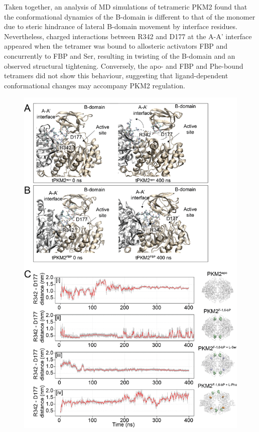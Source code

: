 %
%
Taken together, an analysis of MD simulations of tetrameric PKM2 found that the conformational dynamics of the B-domain is different to that of the monomer due to steric hindrance of lateral B-domain movement by interface residues. Nevertheless, charged interactions between R342 and D177 at the A-A' interface appeared when the tetramer was bound to allosteric activators FBP and concurrently to FBP and Ser, resulting in twisting of the B-domain and an observed structural tightening. Conversely, the apo- and FBP and Phe-bound tetramers did not show this behaviour, suggesting that ligand-dependent conformational changes may accompany PKM2 regulation. 
%
%
%
%
%
\begin{figure}[!ht]
\includegraphics[scale=0.6]{ch6_fig6_tetramer_Bdomain_MD.png}

\end{figure}
